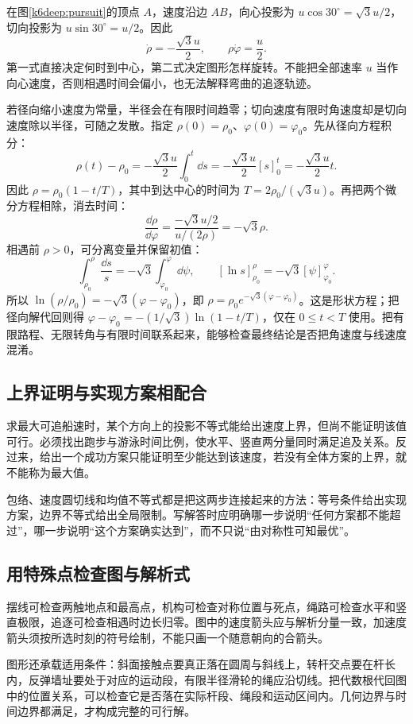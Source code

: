 在图\ref{k6deep:pursuit}的顶点 $A$，速度沿边 $AB$，向心投影为 $u\cos30^\circ=\sqrt3u/2$，切向投影为 $u\sin30^\circ=u/2$。因此
\[\dot\rho=-\frac{\sqrt3u}{2},\qquad \rho\dot\varphi=\frac u2.
\]
第一式直接决定何时到中心，第二式决定图形怎样旋转。不能把全部速率 $u$ 当作向心速度，否则相遇时间会偏小，也无法解释弯曲的追逐轨迹。

若径向缩小速度为常量，半径会在有限时间趋零；切向速度有限时角速度却是切向速度除以半径，可随之发散。指定 $\rho(0)=\rho_0$、$\varphi(0)=\varphi_0$。先从径向方程积分：
\[
\rho(t)-\rho_0
=-\frac{\sqrt3u}{2}\int_0^t\dd s
=-\frac{\sqrt3u}{2}[s]_0^t
=-\frac{\sqrt3u}{2}t.
\]
因此 $\rho=\rho_0(1-t/T)$，其中到达中心的时间为
$T=2\rho_0/(\sqrt3u)$。再把两个微分方程相除，消去时间：
\[
\frac{\dd\rho}{\dd\varphi}
=\frac{-\sqrt3u/2}{u/(2\rho)}=-\sqrt3\rho.
\]
相遇前 $\rho>0$，可分离变量并保留初值：
\[
\int_{\rho_0}^{\rho}\frac{\dd s}{s}
=-\sqrt3\int_{\varphi_0}^{\varphi}\dd\psi,\qquad
[\ln s]_{\rho_0}^{\rho}
=-\sqrt3[\psi]_{\varphi_0}^{\varphi}.
\]
所以 $\ln(\rho/\rho_0)=-\sqrt3(\varphi-\varphi_0)$，即
$\rho=\rho_0e^{-\sqrt3(\varphi-\varphi_0)}$。这是形状方程；把径向解代回则得
$\varphi-\varphi_0=-(1/\sqrt3)\ln(1-t/T)$，仅在 $0\le t<T$ 使用。把有限路程、无限转角与有限时间联系起来，能够检查最终结论是否把角速度与线速度混淆。

\subsection{上界证明与实现方案相配合}
求最大可追船速时，某个方向上的投影不等式能给出速度上界，但尚不能证明该值可行。必须找出跑步与游泳时间比例，使水平、竖直两分量同时满足追及关系。反过来，给出一个成功方案只能证明至少能达到该速度，若没有全体方案的上界，就不能称为最大值。

包络、速度圆切线和均值不等式都是把这两步连接起来的方法：等号条件给出实现方案，边界不等式给出全局限制。写解答时应明确哪一步说明“任何方案都不能超过”，哪一步说明“这个方案确实达到”，而不只说“由对称性可知最优”。

\subsection{用特殊点检查图与解析式}
摆线可检查两触地点和最高点，机构可检查对称位置与死点，绳路可检查水平和竖直极限，追逐可检查相遇时边长归零。图中的速度箭头应与解析分量一致，加速度箭头须按所选时刻的符号绘制，不能只画一个随意朝向的合箭头。

图形还承载适用条件：斜面接触点要真正落在圆周与斜线上，转杆交点要在杆长内，反弹墙址要处于对应的运动段，有限半径滑轮的绳应沿切线。把代数根代回图中的位置关系，可以检查它是否落在实际杆段、绳段和运动区间内。几何边界与时间边界都满足，才构成完整的可行解。

